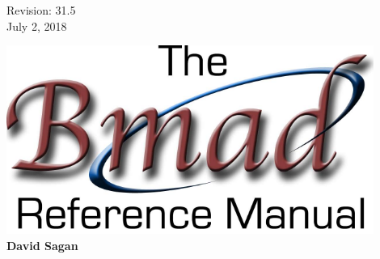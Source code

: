 
\thispagestyle{empty}

\begin{flushright}
\large
  Revision: 31.5 \\
  July 2, 2018 \\
\end{flushright}


\vfill

{
\begin{center}
\includegraphics[width=12cm]{bmad-ref-manual.pdf} \\
\vskip 0.3in
\huge\bf David Sagan
\end{center}
}

\vfill
\break

